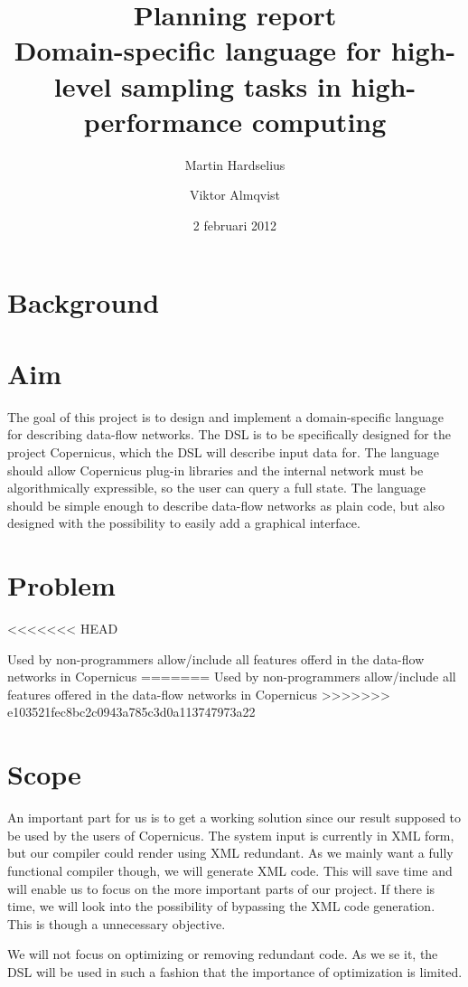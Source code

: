 \documentclass[a4paper]{article}
\title{Planning report\\
  \large{Domain-specific language for high-level
  sampling tasks in high-performance computing
  }
}
\author{Martin Hardselius \and Viktor Almqvist}
\date{2 februari 2012}
\begin{document}
\maketitle
\newpage

\section{Background}

\section{Aim}

The goal of this project is to design and implement a domain-specific
language for describing data-flow networks. The DSL is to be
specifically designed for the project Copernicus, which the DSL will
describe input data for. The language should allow Copernicus plug-in
libraries and the internal network must be algorithmically
expressible, so the user can query a full state. The language should
be simple enough to describe data-flow networks as plain code, but
also designed with the possibility to easily add a graphical
interface.


\section{Problem}

<<<<<<< HEAD


Used by non-programmers
allow/include all features offerd in the data-flow networks in Copernicus
=======
Used by non-programmers allow/include all features offered in the
data-flow networks in Copernicus
>>>>>>> e103521fec8bc2c0943a785c3d0a113747973a22


\section{Scope}

An important part for us is to get a working solution since our result
supposed to be used by the users of Copernicus. The system input is
currently in XML form, but our compiler could render using XML
redundant. As we mainly want a fully functional compiler though, we
will generate XML code. This will save time and will enable us to
focus on the more important parts of our project. If there is time, we
will look into the possibility of bypassing the XML code
generation. This is though a unnecessary objective.

We will not focus on optimizing or removing redundant code. As we se
it, the DSL will be used in such a fashion that the importance of
optimization is limited.
\end{document}
